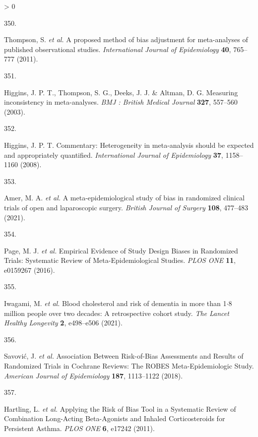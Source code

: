 \documentclass[a4paper, twoside]{templates/ociamthesis}
\newlength{\cslhangindent}
\newlength{\csllabelwidth}
\newenvironment{CSLReferences}[3] %
 {%
  \setlength{\parindent}{0pt}
  \ifodd #1 \everypar{\setlength{\hangindent}{\cslhangindent}}\ignorespaces\fi
  \ifnum #2 > 0
  \setlength{\parskip}{#2\baselineskip}
  \fi
 }%
 {}
\newcommand{\CSLLeftMargin}[1]{\parbox[t]{\maxof{\widthof{#1}}{\csllabelwidth}}{#1}}
\newcommand{\CSLRightInline}[1]{\parbox[t]{\linewidth - \csllabelwidth}{#1}}
\begin{document}
\begin{CSLReferences}{0}{0}
\leavevmode\hypertarget{ref-thompson2011}{}%
\CSLLeftMargin{350. }
\CSLRightInline{Thompson, S. \emph{et al.} A proposed method of bias adjustment for meta-analyses of published observational studies. \emph{International Journal of Epidemiology} \textbf{40}, 765--777 (2011).}

\leavevmode\hypertarget{ref-higgins2003}{}%
\CSLLeftMargin{351. }
\CSLRightInline{Higgins, J. P. T., Thompson, S. G., Deeks, J. J. \& Altman, D. G. Measuring inconsistency in meta-analyses. \emph{BMJ : British Medical Journal} \textbf{327}, 557--560 (2003).}

\leavevmode\hypertarget{ref-higgins2008}{}%
\CSLLeftMargin{352. }
\CSLRightInline{Higgins, J. P. T. Commentary: Heterogeneity in meta-analysis should be expected and appropriately quantified. \emph{International Journal of Epidemiology} \textbf{37}, 1158--1160 (2008).}

\leavevmode\hypertarget{ref-amer2021}{}%
\CSLLeftMargin{353. }
\CSLRightInline{Amer, M. A. \emph{et al.} A meta-epidemiological study of bias in randomized clinical trials of open and laparoscopic surgery. \emph{British Journal of Surgery} \textbf{108}, 477--483 (2021).}

\leavevmode\hypertarget{ref-page2016}{}%
\CSLLeftMargin{354. }
\CSLRightInline{Page, M. J. \emph{et al.} Empirical {Evidence} of {Study Design Biases} in {Randomized Trials}: Systematic {Review} of {Meta}-{Epidemiological Studies}. \emph{PLOS ONE} \textbf{11}, e0159267 (2016).}

\leavevmode\hypertarget{ref-iwagami2021}{}%
\CSLLeftMargin{355. }
\CSLRightInline{Iwagami, M. \emph{et al.} Blood cholesterol and risk of dementia in more than 1{\(\cdot\)}8 million people over two decades: A retrospective cohort study. \emph{The Lancet Healthy Longevity} \textbf{2}, e498--e506 (2021).}

\leavevmode\hypertarget{ref-savovic2018}{}%
\CSLLeftMargin{356. }
\CSLRightInline{Savović, J. \emph{et al.} Association {Between Risk}-of-{Bias Assessments} and {Results} of {Randomized Trials} in {Cochrane Reviews}: The {ROBES Meta}-{Epidemiologic Study}. \emph{American Journal of Epidemiology} \textbf{187}, 1113--1122 (2018).}

\leavevmode\hypertarget{ref-hartling2011}{}%
\CSLLeftMargin{357. }
\CSLRightInline{Hartling, L. \emph{et al.} Applying the {Risk} of {Bias Tool} in a {Systematic Review} of {Combination Long}-{Acting Beta}-{Agonists} and {Inhaled Corticosteroids} for {Persistent Asthma}. \emph{PLOS ONE} \textbf{6}, e17242 (2011).}


\end{CSLReferences}
\end{document}
